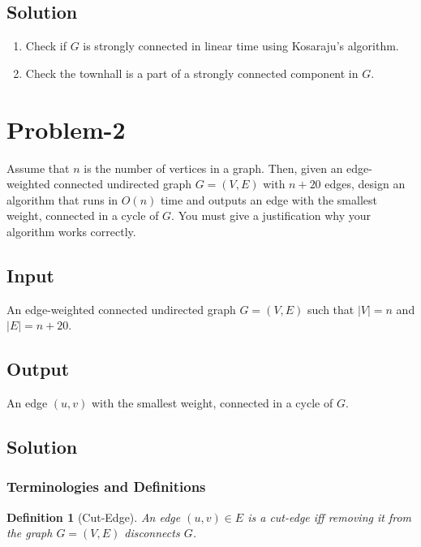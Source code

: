 \documentclass[12pt]{report}
\newtheorem{definition}{Definition}
\begin{document}
    \subsection*{Solution}
    \begin{enumerate}[label=(\alph*)]
        \item Check if $G$ is strongly connected in linear time using Kosaraju's algorithm.
        \item Check the townhall is a part of a strongly connected component in $G$.
    \end{enumerate}

    \pagebreak

    \section*{\huge{Problem-2}}
    Assume that $n$ is the number of vertices in a graph.
    Then, given an edge-weighted connected undirected graph $G = (V, E)$ with $n + 20$ edges, design an algorithm that runs in $O(n)$
    time and outputs an edge with the smallest weight, connected in a cycle of $G$.
    You must give a justification why your algorithm works correctly.

    \subsection*{Input}
    An edge-weighted connected undirected graph $G = (V, E)$ such that $|V| = n$ and $|E| = n + 20$.

    \subsection*{Output}
    An edge $(u, v)$ with the smallest weight, connected in a cycle of $G$.

    \subsection*{Solution}

    \subsubsection*{Terminologies and Definitions}
    \begin{definition}[Cut-Edge]
        \label{def:cut-edge}
        An edge $(u, v) \in E$ is a cut-edge iff removing it from the graph $G = (V, E)$ disconnects $G$.
    \end{definition}
\end{document}
